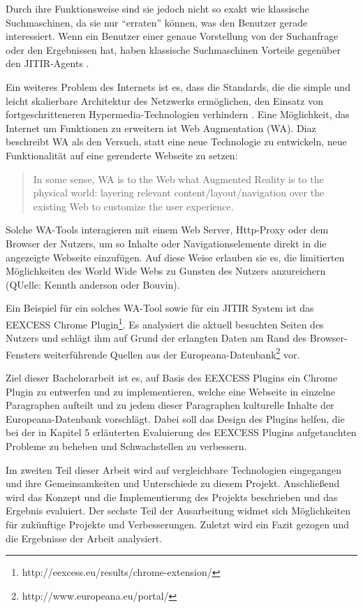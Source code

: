 Durch ihre Funktionsweise sind sie jedoch nicht so exakt wie klassische Suchmaschinen, da sie nur ``erraten'' können, was den Benutzer gerade interessiert. Wenn ein Benutzer einer genaue Vorstellung von der Suchanfrage oder den Ergebnissen hat, haben klassische Suchmaschinen Vorteile gegenüber den JITIR-Agents \cite{rhodes2000just}.

Ein weiteres Problem des Internets ist es, dass die Standards, die die simple und leicht skalierbare Architektur des Netzwerks ermöglichen, den Einsatz von fortgeschritteneren Hypermedia-Technologien verhindern \cite{bouvin1999unifying}. Eine Möglichkeit, das Internet um Funktionen zu erweitern ist Web Augmentation (WA). Diaz \cite{diaz2012understanding} beschreibt WA als den Versuch, statt eine neue Technologie zu entwickeln, neue Funktionalität auf eine gerenderte Webseite zu setzen:
\begin{quote}
In some sense, WA is to the Web what Augmented Reality is to the physical world: layering relevant content/layout/navigation over the existing Web to customize the user experience. \cite{diaz2012understanding}
\end{quote}
Solche WA-Tools interagieren mit einem Web Server, Http-Proxy oder dem Browser der Nutzers, um so Inhalte oder Navigationselemente direkt in die angezeigte Webseite einzufügen. Auf diese Weise erlauben sie es, die limitierten Möglichkeiten des World Wide Webs zu Gunsten des Nutzers anzureichern (QUelle: Kennth anderson oder Bouvin).

Ein Beispiel für ein solches WA-Tool sowie für ein JITIR System ist das EEXCESS Chrome Plugin\footnote{http://eexcess.eu/results/chrome-extension/}. Es analysiert die aktuell besuchten Seiten des Nutzers und schlägt ihm auf Grund der erlangten Daten am Rand des Browser-Fensters weiterführende Quellen aus der Europeana-Datenbank\footnote{http://www.europeana.eu/portal/} vor.

Ziel dieser Bachelorarbeit ist es, auf Basis des EEXCESS Plugins ein Chrome Plugin zu entwerfen und zu implementieren, welche eine Webseite in einzelne Paragraphen aufteilt und zu jedem dieser Paragraphen kulturelle Inhalte der Europeana-Datenbank vorschlägt. Dabei soll das Design des Plugins helfen, die bei der in Kapitel 5 erläuterten Evaluierung des EEXCESS Plugins aufgetauchten Probleme zu beheben und Schwachstellen zu verbessern.

Im zweiten Teil dieser Arbeit wird auf vergleichbare Technologien eingegangen und ihre Gemeinsamkeiten und Unterschiede zu diesem Projekt. Anschließend wird das Konzept und die Implementierung des Projekts beschrieben und das Ergebnis evaluiert. Der sechste Teil der Ausarbeitung widmet sich Möglichkeiten für zukünftige Projekte und Verbesserungen. Zuletzt wird ein Fazit gezogen und die Ergebnisse der Arbeit analysiert.